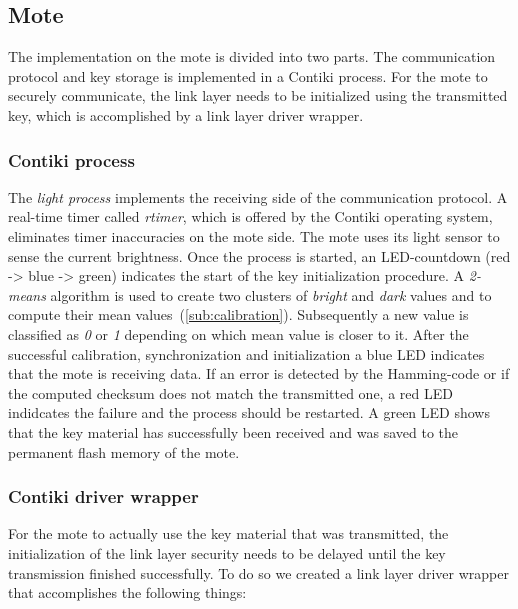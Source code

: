 \documentclass{sig-alternate} %
\begin{document}

\subsection{Mote}
\label{sub:mote}

The implementation on the mote is divided into two parts.
The communication protocol and key storage is implemented in a Contiki process.
For the mote to securely communicate, the link layer needs to be initialized using the transmitted key, which is accomplished by a link layer driver wrapper.

\subsubsection{Contiki process}
\label{ssub:contiki_process}

The \textit{light process} implements the receiving side of the communication protocol.
A real-time timer called \textit{rtimer}, which is offered by the Contiki operating system, eliminates timer inaccuracies on the mote side.
The mote uses its light sensor to sense the current brightness.
Once the process is started, an LED-countdown (red -> blue -> green) indicates the start of the key initialization procedure.
A \mbox{\textit{2-means}} algorithm is used to create two clusters of \textit{bright} and \textit{dark} values and to compute their mean values~(\ref{sub:calibration}).
Subsequently a new value is classified as \textit{0} or \textit{1} depending on which mean value is closer to it.
After the successful calibration, synchronization and initialization a blue LED indicates that the mote is receiving data.
If an error is detected by the Hamming-code or if the computed checksum does not match the transmitted one, a red LED indidcates the failure and the process should be restarted.
A green LED shows that the key material has successfully been received and was saved to the permanent flash memory of the mote.


\subsubsection{Contiki driver wrapper}
\label{ssub:contiki_driver_wrapper}

For the mote to actually use the key material that was transmitted, the initialization of the link layer security needs to be delayed until the key transmission finished successfully.
To do so we created a link layer driver wrapper that accomplishes the following things:
\end{document}
